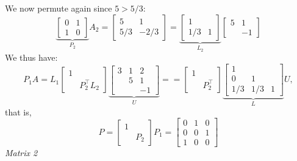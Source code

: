 \documentclass[12pt,a4paper]{article}
\begin{document}
We now permute again since $5 > 5/3$:
\[
\underbrace{\begin{bmatrix} 0 & 1 \\
1 & 0 \end{bmatrix}}_{P_2} A_2 = \begin{bmatrix}5 & 1 \\
5/3 & -2/3 \end{bmatrix} = \underbrace{\begin{bmatrix}1 \\
1/3 & 1 \end{bmatrix}}_{L_2} \begin{bmatrix} 5 & 1 \\ & -1 \end{bmatrix}
\]
We thus have:
\[
P_1 A = L_1 \begin{bmatrix} 1 \\ & P_2^\ensuremath{\top} L_2 \end{bmatrix} \underbrace{\begin{bmatrix}  3 & 1 & 2 \\ 
    & 5 & 1 \\ && -1 \end{bmatrix}}_U = 
    = \begin{bmatrix} 1 \\ & P_2^\ensuremath{\top} \end{bmatrix} 
    \underbrace{\begin{bmatrix} 1 \\ 
    0 & 1 \\
    1/3 & 1/3 & 1 \end{bmatrix}}_L U,
\]
that is,
\[
P = \begin{bmatrix} 1 \\ & P_2 \end{bmatrix} P_1 = \begin{bmatrix}
0 & 1 & 0 \\
0 & 0 & 1 \\
1 & 0 & 0
\end{bmatrix}
\]
\emph{Matrix 2}
\end{document}
